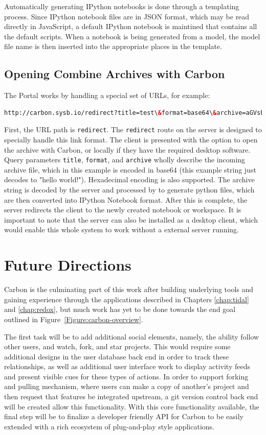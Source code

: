 Automatically generating IPython notebooks is done through a templating process.
Since IPython notebook files are in JSON format, which may be read directly in JavaScript, a default IPython notebook is maintined that contains all the default scripts.
When a notebook is being generated from a model, the model file name is then inserted into the appropriate places in the template.

\subsection{Opening Combine Archives with Carbon}
The Portal works by handling a special set of URLs, for example: 

\begin{lstlisting}[language=html]
http://carbon.sysb.io/redirect?title=test\&format=base64\&archive=aGVsbG8gd29ybGQ=
\end{lstlisting}

First, the URL path is \texttt{redirect}. The \texttt{redirect} route on the server is designed to specially handle this link format.
The client is presented with the option to open the archive with Carbon, or locally if they have the required desktop software.
Query parameters \texttt{title}, \texttt{format}, and \texttt{archive} wholly describe the incoming archive file, which in this example is encoded in base64 (this example string just decodes to "hello world!").
Hexadecimal encoding is also supported.
The archive string is decoded by the server and processed by \autocite{sysbio2014sedml2py} to generate python files, which are then converted into IPython Notebook format.
After this is complete, the server redirects the client to the newly created notebook or workspace.
It is important to note that the server can also be installed as a desktop client, which would enable this whole system to work without a external server running.

\section{Future Directions}

Carbon is the culminating part of this work after building underlying tools and gaining experience through the applications described in Chapters \ref{chap:tidal} and \ref{chap:redox}, but much work has yet to be done towards the end goal outlined in Figure~\ref{Figure:carbon-overview}.

The first task will be to add additional social elements, namely, the ability follow other users, and watch, fork, and star projects.
This would require some additional designs in the user database back end in order to track these relationships, as well as additional user interface work to display activity feeds and present visible cues for these types of actions.
In order to support forking and pulling mechanism, where users can make a copy of another's project and then request that features be integrated upstream, a git version control back end will be created allow this functionality.
With this core functionality available, the final step will be to finalize a developer friendly API for Carbon to be easily extended with a rich ecosystem of plug-and-play style applications.

